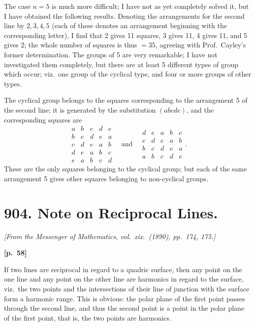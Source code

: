 \documentclass[11pt,a4paper]{article}
\theoremstyle{plain}
\begin{document}
The case $n = 5$ is much more difficult; I have not as yet completely solved it, but I have obtained the following results. Denoting the arrangements for the second line by $2, 3, 4, 5$ (each of these denotes an arrangement beginning with the corresponding letter), I find that 2 gives 11 squares, 3 gives 11, 4 gives 11, and 5 gives 2; the whole number of squares is thus $= 35$, agreeing with Prof.\ Cayley's former determination. The groups of 5 are very remarkable; I have not investigated them completely, but there are at least 5 different types of group which occur; viz.\ one group of the cyclical type, and four or more groups of other types.

The cyclical group belongs to the squares corresponding to the arrangement 5 of the second line; it is generated by the substitution $(abcde)$, and the corresponding squares are
$$
\begin{array}{ccccc}
a & b & c & d & e \\
b & c & d & e & a \\
c & d & e & a & b \\
d & e & a & b & c \\
e & a & b & c & d
\end{array}
\quad \text{and} \quad
\begin{array}{ccccc}
d & e & a & b & c \\
c & d & e & a & b \\
b & c & d & e & a \\
a & b & c & d & e
\end{array}.
$$
These are the only squares belonging to the cyclical group; but each of the same arrangement 5 gives other squares belonging to non-cyclical groups.

\newpage

\section*{904. Note on Reciprocal Lines.}

\noindent\textit{[From the Messenger of Mathematics, vol.\ xix.\ (1890), pp.\ 174, 175.]}

\vspace{0.5em}
\noindent\textbf{[p.\ 58]}

If two lines are reciprocal in regard to a quadric surface, then any point on the one line and any point on the other line are harmonics in regard to the surface, viz.\ the two points and the intersections of their line of junction with the surface form a harmonic range. This is obvious: the polar plane of the first point passes through the second line, and thus the second point is a point in the polar plane of the first point, that is, the two points are harmonics.
\end{document}
